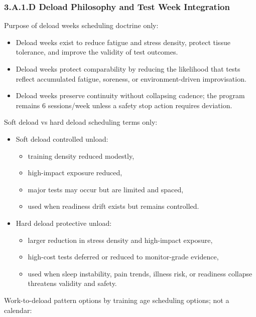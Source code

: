\documentclass[10pt]{article}
\begin{document}
\subsubsection*{3.A.1.D Deload Philosophy and Test Week Integration}

Purpose of deload weeks scheduling doctrine only:

\begin{itemize}
\item Deload weeks exist to reduce fatigue and stress density, protect tissue tolerance, and improve the validity of test outcomes.
\item Deload weeks protect comparability by reducing the likelihood that tests reflect accumulated fatigue, soreness, or environment-driven improvisation.
\item Deload weeks preserve continuity without collapsing cadence; the program remains 6 sessions/week unless a safety stop action requires deviation.
\end{itemize}

Soft deload vs hard deload scheduling terms only:

\begin{itemize}
\item Soft deload controlled unload:
  \begin{itemize}
  \item training density reduced modestly,
  \item high-impact exposure reduced,
  \item major tests may occur but are limited and spaced,
  \item used when readiness drift exists but remains controlled.
  \end{itemize}
\item Hard deload protective unload:
  \begin{itemize}
  \item larger reduction in stress density and high-impact exposure,
  \item high-cost tests deferred or reduced to monitor-grade evidence,
  \item used when sleep instability, pain trends, illness risk, or readiness collapse threatens validity and safety.
  \end{itemize}
\end{itemize}

Work-to-deload pattern options by training age scheduling options; not a calendar:
\end{document}
